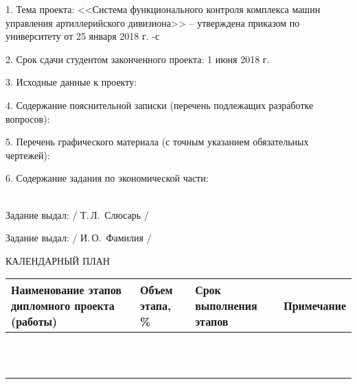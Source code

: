 {    \begin{flushleft}
        1. Тема проекта: <<Система функционального контроля комплекса машин управления артиллерийского дивизиона>> --
        утверждена приказом по университету от 25 января 2018 г. -с

        \vspace{1em}

        2. Срок сдачи студентом законченного проекта: 1 июня 2018 г.

        \vspace{1em}

        3. Исходные данные к проекту:

        \vspace{1em}

        4. Содержание пояснительной записки (перечень подлежащих разработке вопросов):

        5. Перечень графического материала (с точным указанием обязательных чертежей):

        \vspace{1em}

        6. Содержание задания по экономической части:
        \lineunderscore\\
        \lineunderscore\\
        \lineunderscore

        Задание выдал: \hfill{} \uline{\hspace*{6em}} / Т.\,Л.~Слюсарь /

        \vspace{1em}

    \end{flushleft}

    Задание выдал:  \hfill{} \uline{\hspace*{6em}} / И.\,О.~Фамилия /

    \begin{center}
        КАЛЕНДАРНЫЙ ПЛАН
    \end{center}

    \begin{tabular}{
            | >{\centering}m{}
            | >{\centering}m{}
            | >{\centering}m{}
        | >{\centering\arraybackslash}m{}|}
        \hline Наименование этапов дипломного проекта (работы) & Объем этапа, \% & Срок выполнения этапов & Примечание \\
        \hline & & & \\
        \hline & & & \\
        \hline & & & \\
        \hline & & & \\
        \hline & & & \\
        \hline & & & \\
        \hline & & & \\
        \hline & & & \\
        \hline & & & \\
        \hline & & & \\
        \hline & & & \\
        \hline
    \end{tabular}

}
